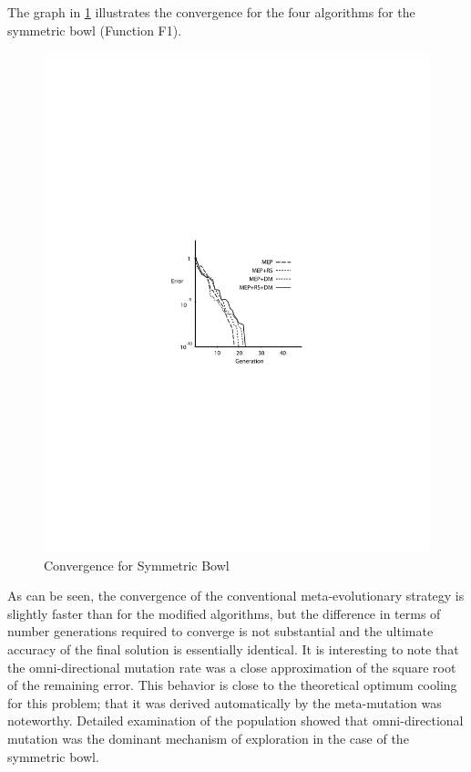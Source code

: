 \documentclass[12pt, titlepage]{article}
\begin{document}
The graph in \ref{fig:f1} illustrates the convergence for the four algorithms
for the symmetric bowl (Function F1).
\begin{figure}
\centerline{\includegraphics{fig1}}
\caption{Convergence for Symmetric Bowl}\label{fig:f1}
\end{figure}
As can be seen, the convergence of the conventional meta-evolutionary
strategy is slightly faster than for the modified algorithms, but the
difference in terms of number generations required to converge is not
substantial and the ultimate accuracy of the final solution is
essentially identical.  It is interesting to note that the
omni-directional mutation rate was a close approximation of the square
root of the remaining error.  This behavior is close to the
theoretical optimum cooling for this problem; that it was derived
automatically by the meta-mutation was noteworthy.  Detailed
examination of the population showed that omni-directional mutation
was the dominant mechanism of exploration in the case of the symmetric
bowl.
\end{document}
